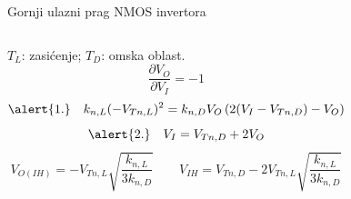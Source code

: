 \begin{frame}[label=09_2-s007]{Gornji ulazni prag NMOS invertora}
\begin{columns}[T,onlytextwidth]\centering {}$T_L$: zasićenje; $T_D$: omska oblast.
\[\frac{\partial V_O}{\partial V_I}=-1\]
\[\alert{1.}\quad k_{n,L}(-V_{Tn,L})^2=k_{n,D}V_O\left(2(V_I-V_{Tn,D})-V_O\right)\]
\[\alert{2.}\quad V_I=V_{Tn,D}+2V_O\]
\[V_{O(IH)}=-V_{Tn,L}\sqrt{\frac{k_{n,L}}{3k_{n,D}}}\qquad V_{IH}=V_{Tn,D}-2V_{Tn,L}\sqrt{\frac{k_{n,L}}{3k_{n,D}}}\]
\end{columns}
\end{frame}
